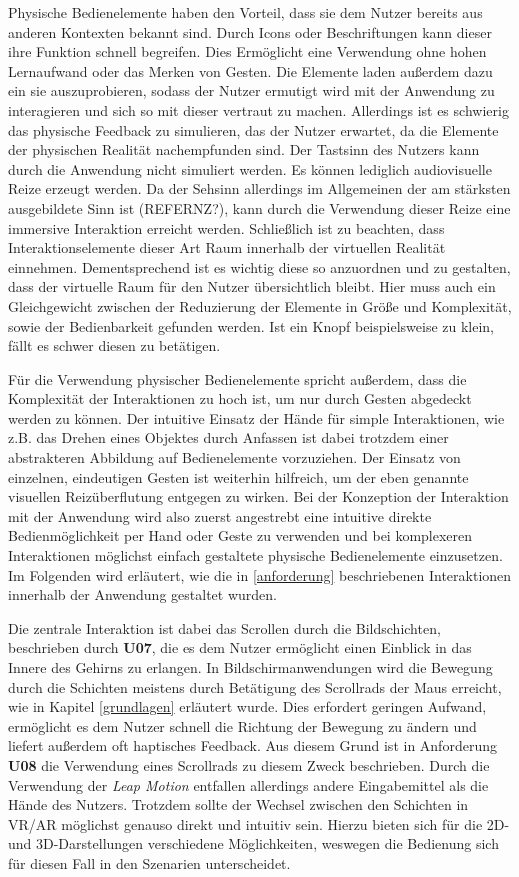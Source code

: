 Physische Bedienelemente haben den Vorteil, dass sie dem Nutzer bereits aus anderen Kontexten bekannt sind. Durch Icons oder Beschriftungen kann dieser ihre Funktion schnell begreifen. 
 Dies Ermöglicht eine Verwendung ohne hohen Lernaufwand oder das Merken von Gesten. 
Die Elemente laden außerdem dazu ein sie auszuprobieren, sodass der Nutzer ermutigt wird mit der Anwendung zu interagieren und sich so mit dieser vertraut zu machen. 
Allerdings ist es schwierig das physische Feedback zu simulieren, das der Nutzer erwartet, da die Elemente der physischen Realität nachempfunden sind. Der Tastsinn des Nutzers kann durch die Anwendung nicht simuliert werden. Es können lediglich audiovisuelle Reize erzeugt werden. Da der Sehsinn allerdings im Allgemeinen der am stärksten ausgebildete Sinn ist (REFERNZ?), kann durch die Verwendung dieser Reize eine immersive Interaktion erreicht werden. 
Schließlich ist zu beachten, dass Interaktionselemente dieser Art Raum innerhalb der virtuellen Realität einnehmen. Dementsprechend ist es wichtig diese so anzuordnen und zu gestalten, dass der virtuelle Raum für den Nutzer übersichtlich bleibt. Hier muss auch ein Gleichgewicht zwischen der Reduzierung der Elemente in Größe und Komplexität, sowie der Bedienbarkeit gefunden werden. Ist ein Knopf beispielsweise zu klein, fällt es schwer diesen zu betätigen. 

Für die Verwendung physischer Bedienelemente spricht außerdem, dass die Komplexität der Interaktionen zu hoch ist, um nur durch Gesten abgedeckt werden zu können. Der intuitive Einsatz der Hände für simple Interaktionen, wie z.B. das Drehen eines Objektes durch Anfassen ist dabei trotzdem einer abstrakteren Abbildung auf Bedienelemente vorzuziehen. Der Einsatz von einzelnen, eindeutigen Gesten ist weiterhin hilfreich, um der eben genannte visuellen Reizüberflutung entgegen zu wirken. 
Bei der Konzeption der Interaktion mit der Anwendung wird also zuerst angestrebt eine intuitive direkte Bedienmöglichkeit per Hand oder Geste zu verwenden und bei komplexeren Interaktionen möglichst einfach gestaltete physische Bedienelemente einzusetzen.
Im Folgenden wird erläutert, wie die in \ref{anforderung} beschriebenen Interaktionen innerhalb der Anwendung gestaltet wurden.

Die zentrale Interaktion ist dabei das Scrollen durch die Bildschichten, beschrieben durch \textbf{U07}, die es dem Nutzer ermöglicht einen Einblick in das Innere des Gehirns zu erlangen. In Bildschirmanwendungen wird die Bewegung durch die Schichten meistens durch Betätigung des Scrollrads der Maus erreicht, wie in Kapitel \ref{grundlagen} erläutert wurde.
Dies erfordert geringen Aufwand, ermöglicht es dem Nutzer schnell die Richtung der Bewegung zu ändern und liefert außerdem oft haptisches Feedback. 
Aus diesem Grund ist in Anforderung \textbf{U08} die Verwendung eines Scrollrads zu diesem Zweck beschrieben. Durch die Verwendung der \textit{Leap Motion} entfallen allerdings andere Eingabemittel als die Hände des Nutzers.
Trotzdem sollte der Wechsel zwischen den Schichten in VR/AR möglichst genauso direkt und intuitiv sein. 
Hierzu bieten sich für die 2D- und 3D-Darstellungen verschiedene Möglichkeiten, weswegen die Bedienung sich für diesen Fall in den Szenarien unterscheidet. 

